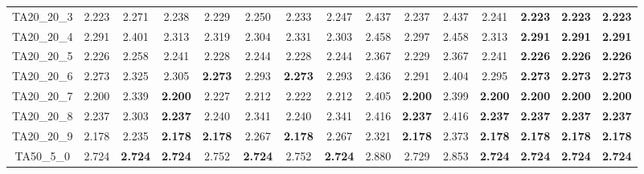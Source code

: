 \begin{tabular}{cc||ccccccccccccc}
TA20\_20\_3        & 2.223            & 2.271            & 2.238            & 2.229            & 2.250            & 2.233            & 2.247            & 2.437            & 2.237            & 2.437            & 2.241            & {\bf 2.223}      & {\bf 2.223}      & {\bf 2.223}     \\ 
TA20\_20\_4        & 2.291            & 2.401            & 2.313            & 2.319            & 2.304            & 2.331            & 2.303            & 2.458            & 2.297            & 2.458            & 2.313            & {\bf 2.291}      & {\bf 2.291}      & {\bf 2.291}     \\ 
TA20\_20\_5        & 2.226            & 2.258            & 2.241            & 2.228            & 2.244            & 2.228            & 2.244            & 2.367            & 2.229            & 2.367            & 2.241            & {\bf 2.226}      & {\bf 2.226}      & {\bf 2.226}     \\ 
TA20\_20\_6        & 2.273            & 2.325            & 2.305            & {\bf 2.273}      & 2.293            & {\bf 2.273}      & 2.293            & 2.436            & 2.291            & 2.404            & 2.295            & {\bf 2.273}      & {\bf 2.273}      & {\bf 2.273}     \\ 
TA20\_20\_7        & 2.200            & 2.339            & {\bf 2.200}      & 2.227            & 2.212            & 2.222            & 2.212            & 2.405            & {\bf 2.200}      & 2.399            & {\bf 2.200}      & {\bf 2.200}      & {\bf 2.200}      & {\bf 2.200}     \\ 
TA20\_20\_8        & 2.237            & 2.303            & {\bf 2.237}      & 2.240            & 2.341            & 2.240            & 2.341            & 2.416            & {\bf 2.237}      & 2.416            & {\bf 2.237}      & {\bf 2.237}      & {\bf 2.237}      & {\bf 2.237}     \\ 
TA20\_20\_9        & 2.178            & 2.235            & {\bf 2.178}      & {\bf 2.178}      & 2.267            & {\bf 2.178}      & 2.267            & 2.321            & {\bf 2.178}      & 2.373            & {\bf 2.178}      & {\bf 2.178}      & {\bf 2.178}      & {\bf 2.178}     \\ 
TA50\_5\_0         & 2.724            & {\bf 2.724}      & {\bf 2.724}      & 2.752            & {\bf 2.724}      & 2.752            & {\bf 2.724}      & 2.880            & 2.729            & 2.853            & {\bf 2.724}      & {\bf 2.724}      & {\bf 2.724}      & {\bf 2.724}     \\ 

\end{tabular}
